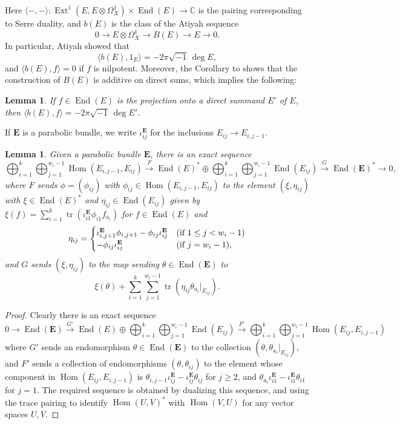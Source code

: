 \documentclass{amsart}
\theoremstyle{plain}
\newtheorem{lem}[thm]{Lemma}
\theoremstyle{definition}
\theoremstyle{remark}
\newcommand{\C}{\mathbb{C}}
\DeclareMathOperator{\tr}{tr}
\DeclareMathOperator{\Hom}{Hom}
\DeclareMathOperator{\End}{End}
\DeclareMathOperator{\Ext}{Ext}
\newcommand{\E}{\mathbf{E}}
\begin{document}
Here $\langle -,-\rangle : \Ext^1(E,E\otimes\Omega^1_X)\times \End(E) \to \C$
is the pairing corresponding to Serre duality, and $b(E)$ is the class of the
Atiyah sequence
\[
0\to E\otimes\Omega^1_X \to B(E)\to E\to 0.
\]
In particular, Atiyah \cite[Proposition 18]{Atiyah} showed that
\[
\langle b(E),1_E \rangle = -2\pi\sqrt{-1} \, \deg E,
\]
and $\langle b(E),f \rangle = 0$ if $f$ is nilpotent.
Moreover, the Corollary to \cite[Proposition 7]{Atiyah} shows
that the construction of $B(E)$ is additive on direct sums,
which implies the following:


\begin{lem}\label{l:atiyahmore}
If $f\in\End(E)$ is the projection onto a direct summand $E'$ of $E$,
then $\langle b(E),f \rangle = -2\pi\sqrt{-1} \, \deg E'$.
\end{lem}


If $\E$ is a parabolic bundle, we write $\iota^\E_{ij}$ for the inclusions $E_{ij}\to E_{i,j-1}$.


\begin{lem}
Given a parabolic bundle $\E$, there is an exact sequence
\[
\bigoplus_{i=1}^k \bigoplus_{j=1}^{w_i-1} \Hom(E_{i,j-1},E_{ij})
\xrightarrow{F}
\End(E)^* \oplus \bigoplus_{i=1}^k \bigoplus_{j=1}^{w_i-1} \End(E_{ij})
\xrightarrow{G}
\End(\E)^* \to 0,
\]
where $F$ sends $\phi=(\phi_{ij})$ with $\phi_{ij}\in\Hom(E_{i,j-1},E_{ij})$
to the element $(\xi,\eta_{ij})$ with $\xi\in\End(E)^*$
and $\eta_{ij}\in \End(E_{ij})$ given by
$\xi(f)=\sum_{i=1}^k \tr(\iota^\E_{i1}\phi_{i1} f_{a_i})$
for $f\in\End(E)$ and
\[
\eta_{ij} = \begin{cases}
\iota^\E_{i,j+1} \phi_{i,j+1} - \phi_{ij} \iota^\E_{ij}
& \text{\textup(if $1\le j< w_i-1$\textup)}
\\
- \phi_{ij} \iota^\E_{ij}
& \text{\textup(if $j=w_i-1$\textup),}
\end{cases}
\]
and $G$ sends $(\xi,\eta_{ij})$ to the map sending $\theta\in\End(\E)$
to
\[
\xi(\theta) + \sum_{i=1}^k \sum_{j=1}^{w_i-1} \tr(\eta_{ij}\theta_{a_i}|_{E_{ij}}).
\]
\end{lem}


\begin{proof}
Clearly there is an exact sequence
\[
0 \to \End(\E)
\xrightarrow{G'}
\End(E) \oplus \bigoplus_{i=1}^k \bigoplus_{j=1}^{w_i-1} \End(E_{ij})
\xrightarrow{F'}
\bigoplus_{i=1}^k \bigoplus_{j=1}^{w_i-1} \Hom(E_{ij},E_{i,j-1})
\]
where $G'$ sends an endomorphism $\theta\in \End(\E)$ to the collection $(\theta, \theta_{a_i}|_{E_{ij}})$,
and $F'$ sends a collection of endomorphisms $(\theta,\theta_{ij})$ to the element whose
component in $\Hom(E_{ij},E_{i,j-1})$ is
$\theta_{i,j-1} \iota^\E_{ij} - \iota^\E_{ij} \theta_{ij}$ for $j\ge 2$,
and
$\theta_{a_i} \iota^\E_{i1} - \iota^\E_{i1} \theta_{i1}$ for $j=1$.
The required sequence is obtained by dualizing this sequence, and using the trace pairing
to identify $\Hom(U,V)^*$ with $\Hom(V,U)$ for any vector spaces $U,V$.
\end{proof}
\end{document}
